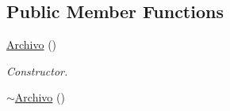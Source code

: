 \subsection*{Public Member Functions}
\begin{DoxyCompactItemize}
\item 
\hyperlink{class_archivo_a0adea0477e973c3e90c34b487d39b8e6}{Archivo} ()\hypertarget{class_archivo_a0adea0477e973c3e90c34b487d39b8e6}{}\label{class_archivo_a0adea0477e973c3e90c34b487d39b8e6}

\begin{DoxyCompactList}\small\item\em Constructor. \end{DoxyCompactList}\item 
\hyperlink{class_archivo_af3a49e41f903ece334f8f597dceca6f1}{$\sim$\+Archivo} ()\hypertarget{class_archivo_af3a49e41f903ece334f8f597dceca6f1}{}\label{class_archivo_af3a49e41f903ece334f8f597dceca6f1}


\end{DoxyCompactItemize}
